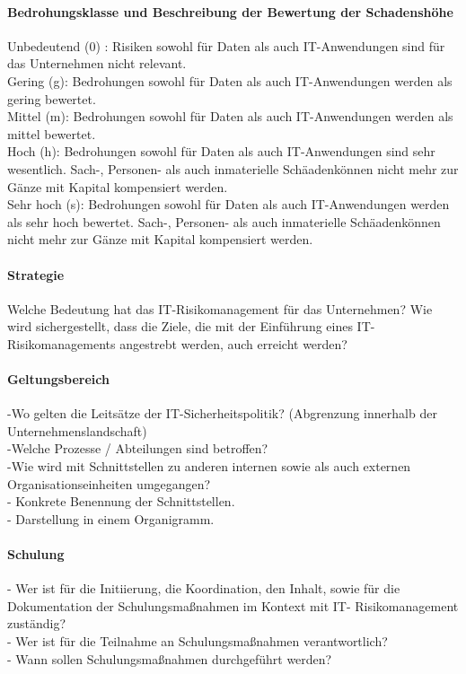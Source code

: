 \paragraph {Bedrohungsklasse und Beschreibung der Bewertung der Schadenshöhe}
Unbedeutend (0) : Risiken sowohl für Daten als auch IT-Anwendungen sind für das Unternehmen nicht relevant.
\\Gering (g): Bedrohungen sowohl für Daten als auch IT-Anwendungen werden als gering bewertet.
\\Mittel (m): Bedrohungen sowohl für Daten als auch IT-Anwendungen werden als mittel bewertet.
\\Hoch (h): Bedrohungen sowohl für Daten als auch IT-Anwendungen sind sehr wesentlich. Sach-, Personen- als auch inmaterielle Schäadenkönnen nicht mehr zur Gänze mit Kapital kompensiert werden.
\\ Sehr hoch (s): Bedrohungen sowohl für Daten als auch IT-Anwendungen werden als sehr hoch bewertet. Sach-, Personen- als auch inmaterielle Schäadenkönnen nicht mehr zur Gänze mit Kapital kompensiert werden.
\paragraph{Strategie}
Welche Bedeutung hat das IT-Risikomanagement für das Unternehmen? 
Wie wird sichergestellt, dass die Ziele, die mit der Einführung eines IT-Risikomanagements angestrebt werden, auch erreicht werden?
\paragraph{Geltungsbereich}
-Wo gelten die Leitsätze der IT-Sicherheitspolitik? (Abgrenzung innerhalb der Unternehmenslandschaft)
\\-Welche Prozesse / Abteilungen sind betroffen?
\\-Wie wird mit Schnittstellen zu anderen internen sowie als auch externen Organisationseinheiten umgegangen?
\\- Konkrete Benennung der Schnittstellen.
\\- Darstellung in einem Organigramm.
\paragraph{Schulung}
- Wer ist für die Initiierung, die Koordination, den Inhalt, sowie für die Dokumentation der Schulungsmaßnahmen im Kontext mit IT- Risikomanagement zuständig?
\\- Wer ist für die Teilnahme an Schulungsmaßnahmen verantwortlich?
\\- Wann sollen Schulungsmaßnahmen durchgeführt werden?
